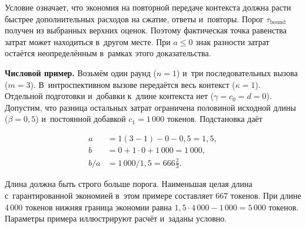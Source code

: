 Условие означает, что экономия на повторной передаче контекста должна расти быстрее дополнительных расходов на сжатие, ответы и~повторы. Порог $\tau_{\mathrm{bound}}$ получен из выбранных верхних оценок. Поэтому фактическая точка равенства затрат может находиться в~другом месте. При $a\le0$ знак разности затрат остаётся неопределённым в~рамках этого доказательства.

\noindent\textbf{Числовой пример.} Возьмём один раунд ($n=1$) и~три последовательных вызова ($m=3$). В~интроспективном вызове передаётся весь контекст ($\kappa=1$). Отдельной подготовки и~добавки к~длине контекста нет ($\gamma=c_0=d=0$). Допустим, что разница остальных затрат ограничена половиной исходной длины ($\beta=0{,}5$) и~постоянной добавкой $c_1=1\,000$ токенов. Подстановка даёт
\begin{formulakey}
\[
\begin{aligned}
 a &= 1(3-1)-0-0{,}5 = 1{,}5,\\
 b &= 0+1\cdot 0+1\,000=1\,000,\\
 b/a &=1\,000/1{,}5=666\tfrac{2}{3}.
\end{aligned}
\]
\begin{symbols}
\end{symbols}
\end{formulakey}
Длина должна быть строго больше порога. Наименьшая целая длина с~гарантированной экономией в~этом примере составляет 667 токенов. При длине 4\,000 токенов нижняя граница экономии равна $1{,}5\cdot4\,000-1\,000=5\,000$ токенов. Параметры примера иллюстрируют расчёт и~заданы условно.

